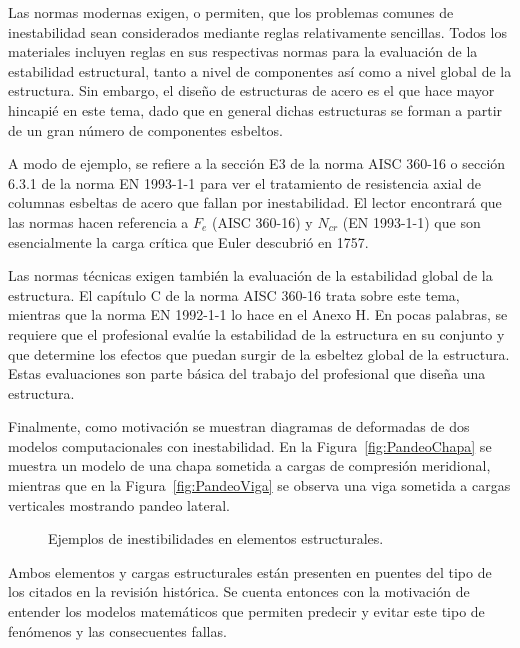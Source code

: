 Las normas modernas exigen, o permiten, que los problemas comunes de inestabilidad sean considerados mediante reglas relativamente sencillas. Todos los materiales incluyen reglas en sus respectivas normas para la evaluación de la estabilidad estructural, tanto a nivel de componentes así como a nivel global de la estructura. %
Sin embargo, el diseño de estructuras de acero es el que hace mayor hincapié en este tema, dado que en general dichas estructuras se forman a partir de un gran número de componentes esbeltos. 

A modo de ejemplo, se refiere a la sección E3 de la norma AISC 360-16 o sección 6.3.1 de la norma EN 1993-1-1 para ver el tratamiento de resistencia axial de columnas esbeltas de acero que fallan por inestabilidad. %
%
El lector encontrará que las normas hacen referencia a $F_e$ (AISC 360-16) y $N_{cr}$ (EN 1993-1-1) que son esencialmente la carga crítica que Euler descubrió en 1757.

Las normas técnicas exigen también la evaluación de la estabilidad global de la estructura. El capítulo C de la norma AISC 360-16 trata sobre este tema, mientras que la norma EN 1992-1-1 lo hace en el Anexo H. %
%
En pocas palabras, se requiere que el profesional evalúe la estabilidad de la estructura en su conjunto y que determine los efectos que puedan surgir de la esbeltez global de la estructura. Estas evaluaciones son parte básica del trabajo del profesional que diseña una estructura.

Finalmente, como motivación se muestran diagramas de deformadas de dos modelos computacionales con inestabilidad. En la Figura~\ref{fig:PandeoChapa} se muestra un modelo de una chapa sometida a cargas de compresión meridional, mientras que en la Figura~\ref{fig:PandeoViga} se observa una viga sometida a cargas verticales mostrando pandeo lateral. 
%
\begin{figure}[htb]
	\centering
	\hfill
	\caption{Ejemplos de inestibilidades en elementos estructurales.}
	\label{fig:PandeoContinuo}
\end{figure}

Ambos elementos y cargas estructurales están presenten en puentes del tipo de los citados en la revisión histórica. Se cuenta entonces con la motivación de entender los modelos matemáticos que permiten predecir y evitar este tipo de fenómenos y las consecuentes fallas.

